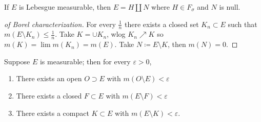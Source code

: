 \begin{proposition}

If \(E\) is Lebesgue measurable, then \(E = H {\textstyle\coprod}N\)
where \(H \in F_\sigma\) and \(N\) is null.

\end{proposition}

\begin{proof}[of Borel characterization]

For every \(\frac 1 n\) there exists a closed set \(K_{n} \subset E\)
such that \(m(E\setminus K_{n}) \leq \frac 1 n\). Take
\(K = \cup K_{n}\), wlog \(K_{n} \nearrow K\) so
\(m(K) = \lim m(K_{n}) = m(E)\). Take \(N\coloneqq E\setminus K\), then
\(m(N) = 0\).

\end{proof}

\begin{theorem}

Suppose \(E\) is measurable; then for every \({\varepsilon}>0\),

\begin{enumerate}
\def\labelenumi{\arabic{enumi}.}
\tightlist
\item
  There exists an open \(O\supset E\) with
  \(m(O\setminus E) < {\varepsilon}\)
\item
  There exists a closed \(F\subset E\) with
  \(m(E\setminus F) < {\varepsilon}\)
\item
  There exists a compact \(K\subset E\) with
  \(m(E\setminus K) < {\varepsilon}\).
\end{enumerate}

\end{theorem}

